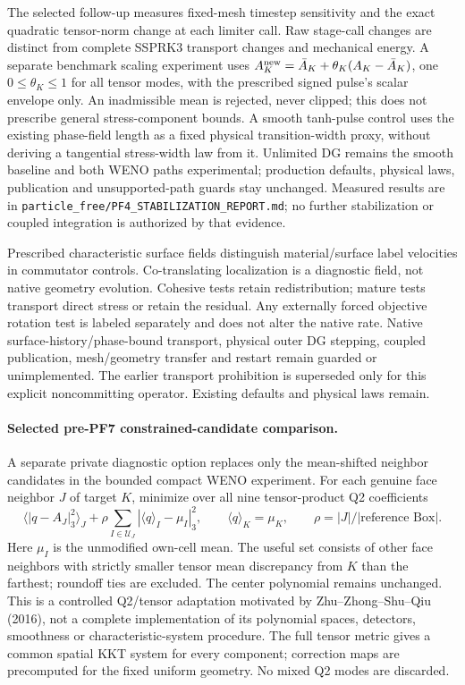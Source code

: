\documentclass[11pt]{article}
\begin{document}
The selected follow-up measures fixed-mesh timestep sensitivity and the exact
quadratic tensor-norm change at each limiter call. Raw stage-call changes are
distinct from complete SSPRK3 transport changes and mechanical energy. A separate
benchmark scaling experiment uses $A_K^{\rm new}=\bar A_K+
\theta_K(A_K-\bar A_K)$, one $0\le\theta_K\le1$ for all tensor modes, with the
prescribed signed pulse's scalar envelope only. An inadmissible mean is rejected,
never clipped; this does not prescribe general stress-component bounds. A smooth
tanh-pulse control uses the existing phase-field length as a fixed physical
transition-width proxy, without deriving a tangential stress-width law from it.
Unlimited DG remains the smooth baseline and both WENO paths experimental;
production defaults, physical laws, publication and unsupported-path guards stay
unchanged.
Measured results are in \texttt{particle\_free/PF4\_STABILIZATION\_REPORT.md}; no
further stabilization or coupled integration is authorized by that evidence.

Prescribed characteristic surface fields distinguish material/surface label
velocities in commutator controls. Co-translating localization is a diagnostic
field, not native geometry evolution. Cohesive tests retain redistribution;
mature tests transport direct stress or retain the residual. Any externally
forced objective rotation test is labeled separately and does not alter the
native rate. Native surface-history/phase-bound transport, physical outer DG
stepping, coupled publication, mesh/geometry transfer and restart remain guarded
or unimplemented. The earlier transport prohibition is superseded only for
this explicit noncommitting operator. Existing defaults and physical laws remain.

\paragraph{Selected pre-PF7 constrained-candidate comparison.}
A separate private diagnostic option replaces only the mean-shifted neighbor
candidates in the bounded compact WENO experiment. For each genuine face
neighbor $J$ of target $K$, minimize over all nine tensor-product Q2 coefficients
\[
 \langle|q-A_J|_3^2\rangle_J+
 \rho\sum_{I\in\mathcal U_J}|\langle q\rangle_I-\mu_I|_3^2,
 \qquad \langle q\rangle_K=\mu_K,
 \qquad \rho=|J|/|\text{reference Box}|.
\]
Here $\mu_I$ is the unmodified own-cell mean. The useful set consists of other
face neighbors with strictly smaller tensor mean discrepancy from $K$ than the
farthest; roundoff ties are excluded. The center polynomial remains unchanged.
This is a controlled Q2/tensor adaptation motivated by Zhu--Zhong--Shu--Qiu
(2016), not a complete implementation of its polynomial spaces, detectors,
smoothness or characteristic-system procedure. The full tensor metric gives a
common spatial KKT system for every component; correction maps are precomputed
for the fixed uniform geometry. No mixed Q2 modes are discarded.
\end{document}
